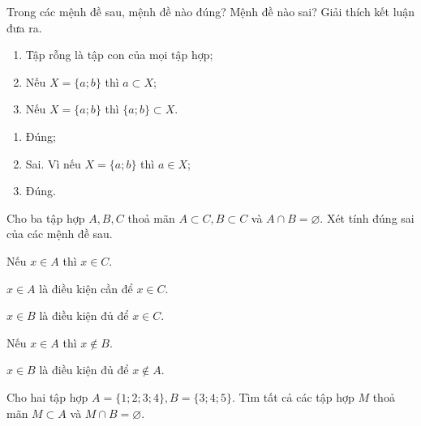 \begin{bt}%
	Trong các mệnh đề sau, mệnh đề nào đúng? Mệnh đề nào sai? Giải thích kết luận đưa ra.
	\begin{enumerate}
		\item Tập rỗng là tập con của mọi tập hợp;
		\item Nếu $X=\{a; b\}$ thì $a\subset X$;
		\item Nếu $X=\{a; b\}$ thì $\{a; b\}\subset X$.
	\end{enumerate}
	\loigiai
	{
		\begin{enumerate}
			\item Đúng;
			\item Sai. Vì nếu $X=\{a; b\}$ thì $a\in X$;
			\item Đúng.
		\end{enumerate}	
	}
\end{bt}

\begin{bt}%
	Cho ba tập hợp $A,B,C$ thoả mãn $A \subset C,B \subset C$ và $A \cap B=\varnothing$. Xét tính đúng sai của các mệnh đề sau.
	\begin{listEX}[2]
		\item  Nếu $x \in A$ thì $x \in C$.
		\item  $x \in A$ là điều kiện cần để $x \in C$.
		\item  $x \in B$ là điều kiện đủ để $x \in C$.
		\item  Nếu $x \in A$ thì $x \notin B$.
		\item  $x \in B$ là điều kiện đủ để $x \notin A$.
	\end{listEX}
\end{bt}

\begin{bt}%
	Cho hai tập hợp $A=\big\{1;2;3;4\big\},B=\big\{3;4;5\big\}$. Tìm tất cả các tập hợp $M$ thoả mãn $M \subset A$ và $M \cap B=\varnothing$.
\end{bt}

